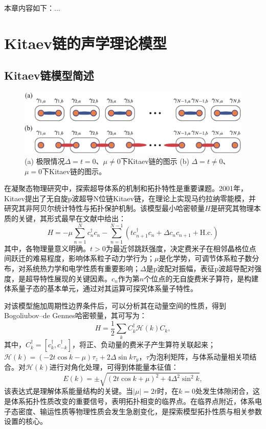 本章内容如下：...

\section{Kitaev链的声学理论模型}

\subsection{Kitaev链模型简述}

\begin{figure}[h!]
    \centering
    \includegraphics[width=1\textwidth]{images/fig5-1.eps} 
    \caption{(a) 极限情况$\Delta = t = 0$、$\mu \neq 0$下Kitaev链的图示 (b) $\Delta = t \neq 0$、$\mu = 0$下Kitaev链的图示。}
    \label{fig_5_1}
\end{figure}

在凝聚态物理研究中，探索超导体系的机制和拓扑特性是重要课题。2001年，Kitaev提出了无自旋p波超导N位链Kitaev链，在理论上实现马约拉纳零能模，并研究其非阿贝尔统计特性与拓扑保护机制。该模型最小哈密顿量$H$是研究其物理本质的关键，其形式最早在文献\cite{C54}中给出：
\begin{equation}\label{eq5-1}
    H = -\mu \sum_{n = 1}^{N} c_{n}^{\dagger} c_{n} - \sum_{n = 1}^{N - 1} (t c_{n + 1}^{\dagger} c_{n} + \Delta c_{n} c_{n + 1} + \text{H.c.})
\end{equation}
其中，各物理量意义明确。$t > 0$为最近邻跳跃强度，决定费米子在相邻晶格位点间跃迁的难易程度，影响体系粒子动力学行为；$\mu$是化学势，可调节体系粒子数分布，对系统热力学和电学性质有重要影响；$\Delta$是p波配对振幅，表征p波超导配对强度，是超导特性展现的关键因素。$c_{n}$作为第$n$个位点的无自旋费米子算符，是构建体系量子态的基本单元，通过对其运算可探究体系量子特性。

对该模型施加周期性边界条件后，可以分析其在动量空间的性质，得到Bogoliubov–de Gennes哈密顿量，其可写为：
\begin{equation}\label{eq5-2}
    H = \frac{1}{2} \sum_{k} C_{k}^{\dagger} \mathcal{H}(k) C_{k},
\end{equation}
其中，$C_{k}^{\dagger} = [c_{k}^{\dagger}, c_{-k}^{\dagger}]$，将正、负动量的费米子产生算符关联起来；$\mathcal{H}(k) = (-2t \cos k - \mu) \tau_{z} + 2\Delta \sin k \tau_{y}$，$\tau$为泡利矩阵，与体系动量相关项结合。对$\mathcal{H}(k)$进行对角化处理，可得到体能量本征值：
\begin{equation}\label{eq5-3}
    E(k) = \pm \sqrt{(2t \cos k + \mu)^{2} + 4\Delta^{2} \sin^{2} k},
\end{equation}
该表达式是理解体系能量结构的关键。当$\vert \mu \vert = 2t$时，在$k = 0$处发生体隙闭合，这是体系拓扑性质改变的重要信号，表明拓扑相变的临界点。在临界点附近，体系电子态密度、输运性质等物理性质会发生急剧变化，是探索模型拓扑性质与相关参数设置的核心。


